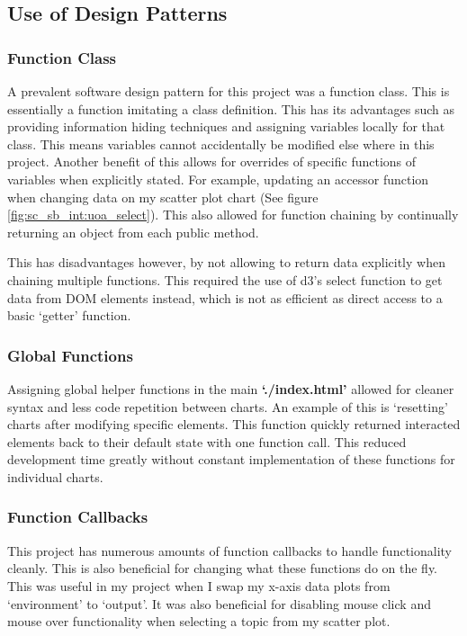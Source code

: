 \documentclass[a4paper, 11pt]{article}
\begin{document}
\newpage
\subsection{Use of Design Patterns}
\subsubsection{Function Class}
A prevalent software design pattern for this project was a function class. This is essentially a function imitating a class definition. This has its advantages such as providing information hiding techniques and assigning variables locally for that class. This means variables cannot accidentally be modified else where in this project. Another benefit of this allows for overrides of specific functions of variables when explicitly stated. For example, updating an accessor function when changing data on my scatter plot chart (See figure \ref{fig:sc_sb_int:uoa_select}). This also allowed for function chaining by continually returning an object from each public method.

This has disadvantages however, by not allowing to return data explicitly when chaining multiple functions. This required the use of d3's select function to get data from DOM elements instead, which is not as efficient as direct access to a basic `getter' function.

\subsubsection{Global Functions}
Assigning global helper functions in the main \textbf{`./index.html'} allowed for cleaner syntax and less code repetition between charts. An example of this is `resetting' charts after modifying specific elements. This function quickly returned interacted elements back to their default state with one function call. This reduced development time greatly without constant implementation of these functions for individual charts.

\subsubsection{Function Callbacks}
This project has numerous amounts of function callbacks to handle functionality cleanly. This is also beneficial for changing what these functions do on the fly. This was useful in my project when I swap my x-axis data plots from `environment' to `output'. It was also beneficial for disabling mouse click and mouse over functionality when selecting a topic from my scatter plot.
\end{document}
